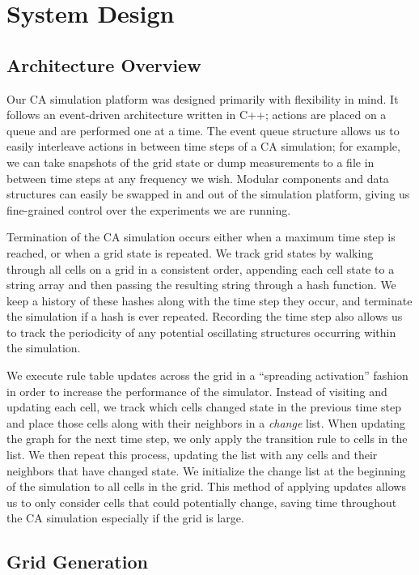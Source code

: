 \documentclass[a4paper,11pt]{article}
\begin{document}
\section{System Design}
\label{sec:System}

\subsection{Architecture Overview}
Our CA simulation platform was designed primarily with flexibility in mind.
It follows an event-driven architecture written in C++; actions are placed on a queue and are performed one at a time.
The event queue structure allows us to easily interleave actions in between time steps of a CA simulation; for example, we can take snapshots of the grid state or dump measurements to a file in between time steps at any frequency we wish.
Modular components and data structures can easily be swapped in and out of the simulation platform, giving us fine-grained control over the experiments we are running.

Termination of the CA simulation occurs either when a maximum time step is reached, or when a grid state is repeated.
We track grid states by walking through all cells on a grid in a consistent order, appending each cell state to a string array and then passing the resulting string through a hash function.
We keep a history of these hashes along with the time step they occur, and terminate the simulation if a hash is ever repeated.
Recording the time step also allows us to track the periodicity of any potential oscillating structures occurring within the simulation.

We execute rule table updates across the grid in a ``spreading activation'' fashion in order to increase the performance of the simulator.
Instead of visiting and updating each cell, we track which cells changed state in the previous time step and place those cells along with their neighbors in a \textit{change} list.
When updating the graph for the next time step, we only apply the transition rule to cells in the list.
We then repeat this process, updating the list with any cells and their neighbors that have changed state.
We initialize the change list at the beginning of the simulation to all cells in the grid.
This method of applying updates allows us to only consider cells that could potentially change, saving time throughout the CA simulation especially if the grid is large.

\subsection{Grid Generation}
\label{subsec:GridGen}
\end{document}
